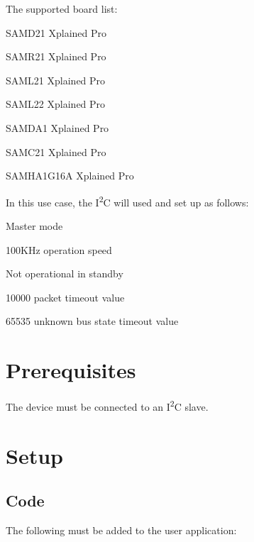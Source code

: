 The supported board list\+:
\begin{DoxyItemize}
\item S\+A\+M\+D21 Xplained Pro
\item S\+A\+M\+R21 Xplained Pro
\item S\+A\+M\+L21 Xplained Pro
\item S\+A\+M\+L22 Xplained Pro
\item S\+A\+M\+D\+A1 Xplained Pro
\item S\+A\+M\+C21 Xplained Pro
\item S\+A\+M\+H\+A1\+G16A Xplained Pro
\end{DoxyItemize}

In this use case, the I\textsuperscript{2}C will used and set up as follows\+:
\begin{DoxyItemize}
\item Master mode
\item 100K\+Hz operation speed
\item Not operational in standby
\item 10000 packet timeout value
\item 65535 unknown bus state timeout value
\end{DoxyItemize}\hypertarget{asfdoc_sam0_sercom_i2c_master_dma_use_case_asfdoc_sam0_sercom_i2c_master_dma_use_case_prereq}{}\section{Prerequisites}\label{asfdoc_sam0_sercom_i2c_master_dma_use_case_asfdoc_sam0_sercom_i2c_master_dma_use_case_prereq}
The device must be connected to an I\textsuperscript{2}C slave.\hypertarget{asfdoc_sam0_sercom_i2c_master_dma_use_case_asfdoc_sam0_sercom_i2c_master_dma_use_setup}{}\section{Setup}\label{asfdoc_sam0_sercom_i2c_master_dma_use_case_asfdoc_sam0_sercom_i2c_master_dma_use_setup}
\hypertarget{asfdoc_sam0_sercom_i2c_master_dma_use_case_asfdoc_sam0_sercom_i2c_master_dma_use_setup_code}{}\subsection{Code}\label{asfdoc_sam0_sercom_i2c_master_dma_use_case_asfdoc_sam0_sercom_i2c_master_dma_use_setup_code}
The following must be added to the user application\+:


